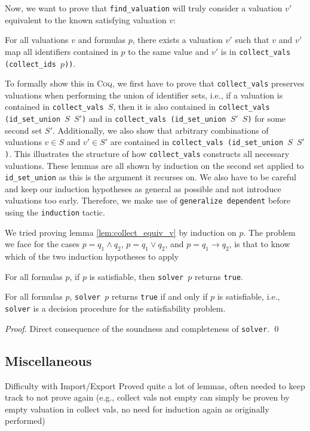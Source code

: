Now, we want to prove that \texttt{find\_valuation} will truly consider a valuation $v'$ equivalent to the known satisfying valuation $v$:
\begin{lemma}\label{lem:collect_equiv_v}
    For all valuations $v$ and formulas $p$, there exists a valuation $v'$ such that $v$ and $v'$ map all identifiers contained in $p$ to the same value and $v'$ is in \texttt{collect\_vals (collect\_ids $p$))}.
\end{lemma}
To formally show this in \textsc{Coq}, we first have to prove that \texttt{collect\_vals} preserves valuations when performing the union of identifier sets, i.e., if a valuation is contained in \texttt{collect\_vals $S$}, then it is also contained in \texttt{collect\_vals (id\_set\_union $S$ $S'$)} and in \texttt{collect\_vals (id\_set\_union $S'$ $S$)} for some second set $S'$.
Additionally, we also show that arbitrary combinations of valuations $v \in S$ and $v' \in S'$ are contained in \texttt{collect\_vals (id\_set\_union $S$ $S'$)}.
This illustrates the structure of how \texttt{collect\_vals} constructs all necessary valuations.
These lemmas are all shown by induction on the second set applied to \texttt{id\_set\_union} as this is the argument it recurses on.
We also have to be careful and keep our induction hypotheses as general as possible and not introduce valuations too early.
Therefore, we make use of \texttt{generalize dependent} before using the \texttt{induction} tactic.

We tried proving lemma \ref{lem:collect_equiv_v} by induction on $p$.
The problem we face for the cases $p = q_1 \land q_2$, $p = q_1 \lor q_2$, and $p = q_1 \rightarrow q_2$, is that to know which of the two induction hypotheses to apply %

\begin{lemma}
    For all formulas $p$, if $p$ is satisfiable, then \texttt{solver $p$} returns \texttt{true}.
\end{lemma}


\begin{theorem}
    For all formulas $p$, \texttt{solver $p$} returns \texttt{true} if and only if $p$ is satisfiable, i.e., \texttt{solver} is a decision procedure for the satisfiability problem.
\end{theorem}
\begin{proof}
    Direct consequence of the soundness and completeness of \texttt{solver}. \qed
\end{proof}

\subsection{Miscellaneous}

Difficulty with Import/Export
Proved quite a lot of lemmas, often needed to keep track to not prove again (e.g., collect vals not empty can simply be proven by empty valuation in collect vals, no need for induction again as originally performed)
